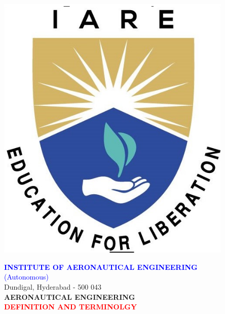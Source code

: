 \documentclass[11pt,paper=a4,answers]{exam}
\begin{document}
	\begin{minipage}{\linewidth}
	\begin{minipage}{0.14\linewidth}%
\includegraphics[width=0.85\textwidth]{iare.png}\end{minipage}
	\begin{minipage}[r]{0.86\textwidth}%
		\noindent
		\begin{center}	
			\textcolor{blue}{\Large \bfseries INSTITUTE OF AERONAUTICAL ENGINEERING}\\
			\textcolor{blue}{\Large (Autonomous)} \\
			\small Dundigal, Hyderabad - 500 043 \\  [3pt] 
			\vspace{5pt}
			\large \bfseries AERONAUTICAL ENGINEERING \\\vspace{5pt}
			\textcolor{red}{\large \bfseries DEFINITION AND TERMINOLGY} \\\vspace{3pt}
		\end{center}
	\end{minipage}
	\end{minipage}
\end{document}
